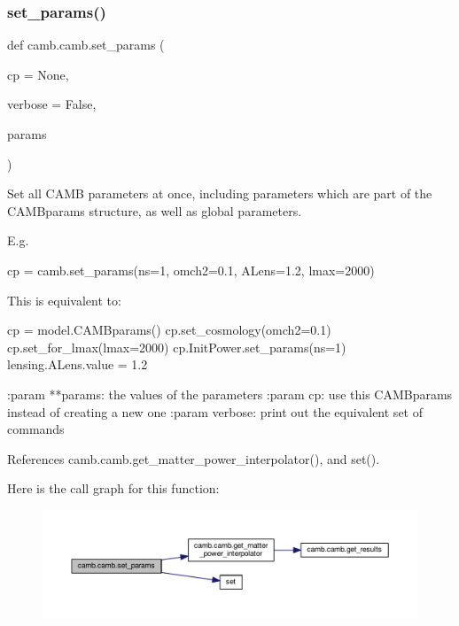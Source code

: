 \subsubsection{\texorpdfstring{set\+\_\+params()}{set\_params()}}
{\footnotesize\ttfamily def camb.\+camb.\+set\+\_\+params (\begin{DoxyParamCaption}\item[{}]{cp = {\ttfamily None},  }\item[{}]{verbose = {\ttfamily False},  }\item[{}]{params }\end{DoxyParamCaption})}

\begin{DoxyVerb}Set all CAMB parameters at once, including parameters which are part of the 
CAMBparams structure, as well as global parameters.

E.g. 

cp = camb.set_params(ns=1, omch2=0.1, ALens=1.2, lmax=2000)

This is equivalent to:

cp = model.CAMBparams()
cp.set_cosmology(omch2=0.1)
cp.set_for_lmax(lmax=2000)
cp.InitPower.set_params(ns=1)
lensing.ALens.value = 1.2


:param **params: the values of the parameters
:param cp: use this CAMBparams instead of creating a new one
:param verbose: print out the equivalent set of commands \end{DoxyVerb}
 

References camb.\+camb.\+get\+\_\+matter\+\_\+power\+\_\+interpolator(), and set().

Here is the call graph for this function\+:
\nopagebreak
\begin{figure}[H]
\begin{center}
\leavevmode
\includegraphics[width=350pt]{namespacecamb_1_1camb_a79ab5665516443404a5fefc3a350b568_cgraph}
\end{center}
\end{figure}
\mbox{\label{namespacecamb_1_1camb_a1278c06959fade5c036b95daa28b8b11}} 
